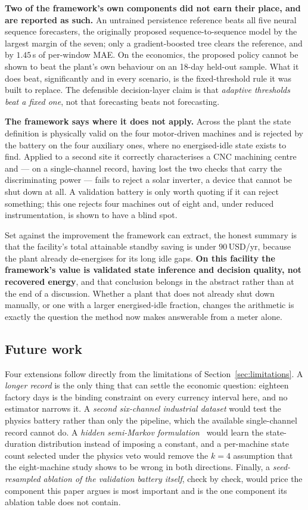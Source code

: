 \textbf{Two of the framework's own components did not earn their
place, and are reported as such.} An untrained persistence reference
beats all five neural sequence forecasters, the originally proposed
sequence-to-sequence model by the largest margin of the seven; only a
gradient-boosted tree clears the reference, and by $1.45$\,s of
per-window MAE. On the economics, the proposed policy cannot be shown to
beat the plant's own behaviour on an 18-day held-out sample. What it
does beat, significantly and in every scenario, is the fixed-threshold
rule it was built to replace. The defensible decision-layer claim is
that \emph{adaptive thresholds beat a fixed one}, not that forecasting
beats not forecasting.

\textbf{The framework says where it does not apply.} Across the plant
the state definition is physically valid on the four motor-driven
machines and is rejected by the battery on the four auxiliary ones,
where no energised-idle state exists to find. Applied to a second site
it correctly characterises a CNC machining centre and --- on a
single-channel record, having lost the two checks that carry the
discriminating power --- fails to reject a solar inverter, a device that
cannot be shut down at all. A validation battery is only worth quoting
if it can reject something; this one rejects four machines out of eight
and, under reduced instrumentation, is shown to have a blind spot.

\medskip
\noindent
Set against the improvement the framework can extract, the honest
summary is that the facility's total attainable standby saving is under
$90$\,USD/yr, because the plant already de-energises for its long idle
gaps. \textbf{On this facility the framework's value is validated state
inference and decision quality, not recovered energy}, and that
conclusion belongs in the abstract rather than at the end of a
discussion. Whether a plant that does not already shut down manually,
or one with a larger energised-idle fraction, changes the arithmetic is
exactly the question the method now makes answerable from a meter
alone.

\subsection*{Future work}

Four extensions follow directly from the limitations of
Section~\ref{sec:limitations}. A \emph{longer record} is the only thing
that can settle the economic question: eighteen factory days is the
binding constraint on every currency interval here, and no estimator
narrows it. A \emph{second six-channel industrial dataset} would test
the physics battery rather than only the pipeline, which the available
single-channel record cannot do. A \emph{hidden semi-Markov
formulation}~\cite{yu2010hsmm} would learn the state-duration
distribution instead of imposing a constant, and a per-machine state
count selected under the physics veto would remove the $k=4$ assumption
that the eight-machine study shows to be wrong in both directions.
Finally, a \emph{seed-resampled ablation of the validation battery
itself}, check by check, would price the component this paper argues is
most important and is the one component its ablation table does not
contain.
